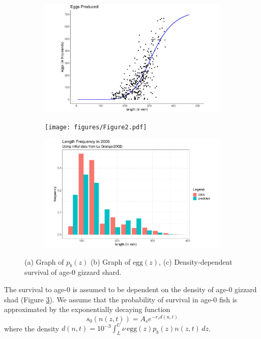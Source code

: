 \documentclass[11pt,oneside]{amsart}
\def\ds{\displaystyle}
\theoremstyle{definition}
\begin{document}
\begin{figure}
\centering
\begin{subfigure}[b]{.32\textwidth}
  \includegraphics[width=\textwidth]{figures/Figure1.pdf}
  \caption{}
  \label{fig:repro_prob}
\end{subfigure}
\begin{subfigure}[b]{.32\textwidth}
  \texttt{[image: figures/Figure2.pdf]}
  \caption{}
  \label{fig:eggs}
\end{subfigure}
\begin{subfigure}[b]{.32\textwidth}
  \includegraphics[width=\textwidth]{figures/Figure3.pdf}
  \caption{}
  \label{fig:surv_age0}
\end{subfigure}
\caption{(a) Graph of $p_b(z)$ (b) Graph of $\mbox{egg}(z)$, (c) Density-dependent survival of age-0 gizzard shard.}
\label{fig:fecundity}
\end{figure}    


The survival to age-0 is assumed to be dependent on the density of age-0 gizzard shad (Figure \ref{fig:surv_age0}).  We assume that the probability of survival in age-0 fish is approximated by the exponentially decaying function
\begin{equation}\label{eq:age0surv}
s_0(n(z,t)) = A_s e^{-r_s d(n,t)}
\end{equation}
where the density $\ds d(n,t) = 10^{-3} \int_L^U \nu \, \mbox{egg}(z) p_b(z) n(z,t) \, dz$. 
\end{document}
